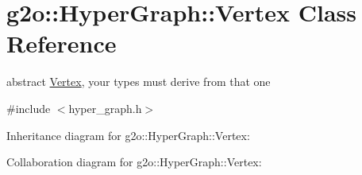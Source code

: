 \hypertarget{classg2o_1_1HyperGraph_1_1Vertex}{}\section{g2o\+:\+:Hyper\+Graph\+:\+:Vertex Class Reference}
\label{classg2o_1_1HyperGraph_1_1Vertex}


abstract \hyperlink{classg2o_1_1HyperGraph_1_1Vertex}{Vertex}, your types must derive from that one  




{\ttfamily \#include $<$hyper\+\_\+graph.\+h$>$}



Inheritance diagram for g2o\+:\+:Hyper\+Graph\+:\+:Vertex\+:


Collaboration diagram for g2o\+:\+:Hyper\+Graph\+:\+:Vertex\+:
